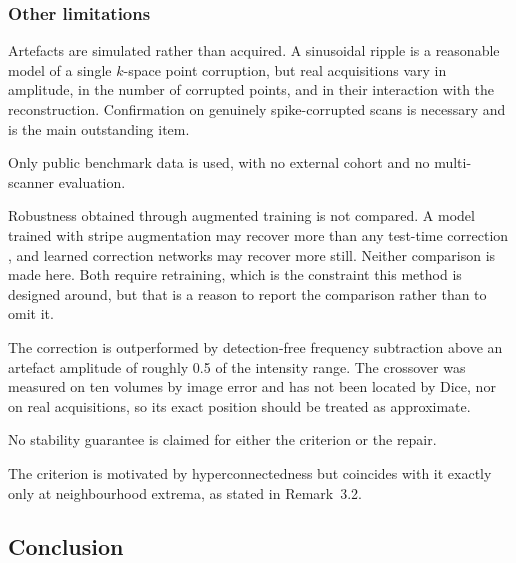 \documentclass[12pt]{article}
\theoremstyle{definition}
\theoremstyle{plain}
\begin{document}
\subsubsection{Other limitations}

Artefacts are simulated rather than acquired. A sinusoidal ripple is a reasonable
model of a single $k$-space point corruption, but real acquisitions vary in
amplitude, in the number of corrupted points, and in their interaction with the
reconstruction. Confirmation on genuinely spike-corrupted scans is necessary and is
the main outstanding item.

Only public benchmark data is used, with no external cohort and no multi-scanner
evaluation.

Robustness obtained through augmented training is not compared. A model trained with
stripe augmentation may recover more than any test-time correction
\cite{boone2023rood,tamada2025}, and learned correction networks
\cite{rios2026} may recover more still. Neither comparison is made here. Both
require retraining, which is the constraint this method is designed around, but
that is a reason to report the comparison rather than to omit it.

The correction is outperformed by detection-free frequency subtraction above an
artefact amplitude of roughly 0.5 of the intensity range. The crossover was measured
on ten volumes by image error and has not been located by Dice, nor on real
acquisitions, so its exact position should be treated as approximate.

No stability guarantee is claimed for either the criterion or the repair.

The criterion is motivated by hyperconnectedness but coincides with it exactly only
at neighbourhood extrema, as stated in Remark~3.2.

\subsection{Conclusion}
\end{document}
